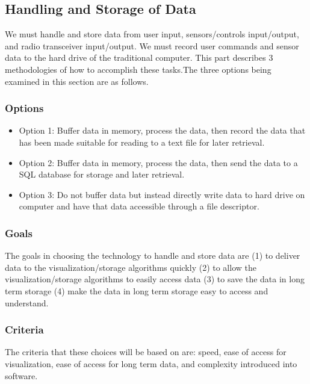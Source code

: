 \documentclass[10pt,draftclsnofoot,onecolumn,retainorgcmds]{IEEEtran}
\begin{document}
\subsection{Handling and Storage of Data}
We must handle and store data from user input, sensors/controls input/output, and radio transceiver input/output.  We must record user commands and sensor data to the hard drive of the traditional computer. This part describes 3 methodologies of how to accomplish these tasks.The three options being examined in this section are as follows. \\
\subsubsection{Options}
\begin{itemize}
	\item Option 1: Buffer data in memory, process the data, then record the data that has been made suitable for reading to a text file for later retrieval.
	\item Option 2: Buffer data in memory, process the data, then send the data to a SQL database for storage and later retrieval.
	\item Option 3: Do not buffer data but instead directly write data to hard drive on computer and have that data accessible through a file descriptor.\\
\end{itemize}
\subsubsection{Goals}
The goals in choosing the technology to handle and store data are (1) to deliver data to the visualization/storage algorithms quickly (2) to allow the visualization/storage algorithms to easily access data (3) to save the data in long term storage (4) make the data in long term storage easy to access and understand.\\

\subsubsection{Criteria}
The criteria that these choices will be based on are: speed, ease of access for visualization, ease of access for long term data, and complexity introduced into software.\\
\end{document}
